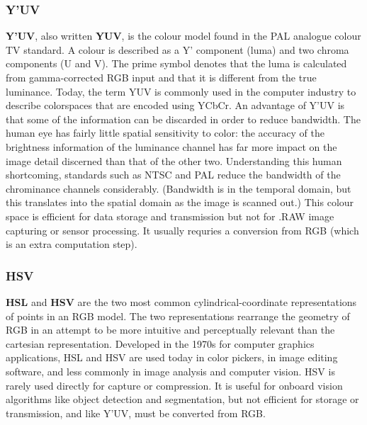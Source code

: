 \documentclass[10pt]{article}
\begin{document}
\begin{multicols}{2}
\subsubsection{Y'UV}
\textbf{Y'UV}, also written \textbf{YUV}, is the colour model found in the PAL analogue colour TV standard. A colour is described as a Y' component (luma) and two chroma components (U and V). The prime symbol denotes that the luma is calculated from gamma-corrected RGB input and that it is different from the true luminance.
Today, the term YUV is commonly used in the computer industry to describe colorspaces that are encoded using YCbCr.
\newline \newline
An advantage of Y'UV is that some of the information can be discarded in order to reduce bandwidth. The human eye has fairly little spatial sensitivity to color: the accuracy of the brightness information of the luminance channel has far more impact on the image detail discerned than that of the other two. Understanding this human shortcoming, standards such as NTSC and PAL reduce the bandwidth of the chrominance channels considerably. (Bandwidth is in the temporal domain, but this translates into the spatial domain as the image is scanned out.)
\newline \newline
This colour space is efficient for data storage and transmission but not for .RAW image capturing or sensor processing. It usually requries a conversion from RGB (which is an extra computation step).

\subsubsection{HSV}
\textbf{HSL} and \textbf{HSV} are the two most common cylindrical-coordinate representations of points in an RGB model. The two representations rearrange the geometry of RGB in an attempt to be more intuitive and perceptually relevant than the cartesian representation. Developed in the 1970s for computer graphics applications, HSL and HSV are used today in color pickers, in image editing software, and less commonly in image analysis and computer vision.
\newline \newline
HSV is rarely used directly for capture or compression. It is useful for onboard vision algorithms like object detection and segmentation, but not efficient for storage or transmission, and like Y'UV, must be converted from RGB.


\end{multicols}
\end{document}
